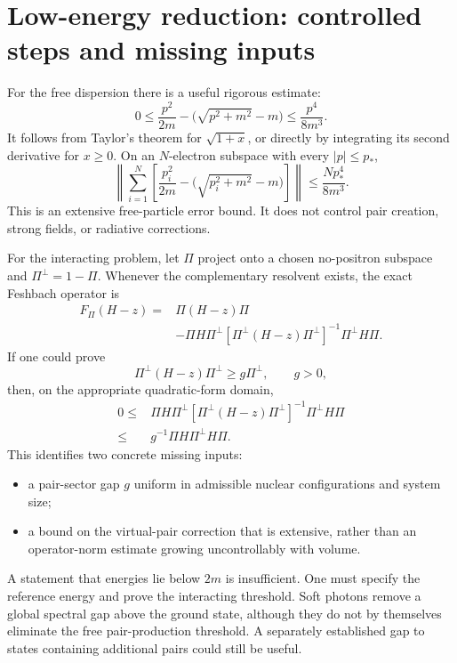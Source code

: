 \section{Low-energy reduction: controlled steps and missing inputs}
\label{sec:effective}
For the free dispersion there is a useful rigorous estimate:
\begin{equation}
0\le\frac{p^2}{2m}-\bigl(\sqrt{p^2+m^2}-m\bigr)
\le\frac{p^4}{8m^3}.
\label{eq:dispersion}
\end{equation}
It follows from Taylor's theorem for \(\sqrt{1+x}\), or directly by
integrating its second derivative for \(x\ge0\).
On an \(N\)-electron subspace with every \(|p|\le p_*\),
\begin{equation}
\left\|\sum_{i=1}^N\left[
\frac{p_i^2}{2m}-\bigl(\sqrt{p_i^2+m^2}-m\bigr)
\right]\right\|
\le\frac{Np_*^4}{8m^3}.
\label{eq:free-error}
\end{equation}
This is an extensive free-particle error bound. It does not control pair
creation, strong fields, or radiative corrections.

For the interacting problem, let \(\Pi\) project onto a chosen no-positron
subspace and \(\Pi^\perp=1-\Pi\). Whenever the complementary resolvent
exists, the exact Feshbach operator is
\begin{equation}
\begin{split}
F_\Pi(H-z)={}&\Pi(H-z)\Pi\\
&-\Pi H\Pi^\perp
\left[\Pi^\perp(H-z)\Pi^\perp\right]^{-1}
\Pi^\perp H\Pi.
\end{split}
\label{eq:feshbach}
\end{equation}
If one could prove
\begin{equation}
\Pi^\perp(H-z)\Pi^\perp\ge g\Pi^\perp,\qquad g>0,
\label{eq:gap}
\end{equation}
then, on the appropriate quadratic-form domain,
\begin{equation}
\begin{split}
0\le{}&
\Pi H\Pi^\perp
\left[\Pi^\perp(H-z)\Pi^\perp\right]^{-1}
\Pi^\perp H\Pi\\
\le{}&g^{-1}\Pi H\Pi^\perp H\Pi.
\end{split}
\label{eq:feshbach-bound}
\end{equation}
This identifies two concrete missing inputs:
\begin{itemize}
\item a pair-sector gap \(g\) uniform in admissible nuclear configurations
and system size;
\item a bound on the virtual-pair correction that is extensive, rather than
an operator-norm estimate growing uncontrollably with volume.
\end{itemize}
A statement that energies lie below \(2m\) is insufficient. One must
specify the reference energy and prove the interacting threshold. Soft
photons remove a global spectral gap above the ground state, although they
do not by themselves eliminate the free pair-production threshold. A
separately established gap to states containing additional pairs could
still be useful.

